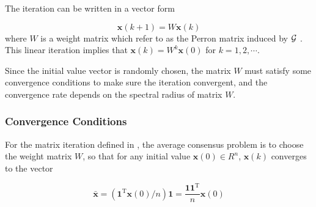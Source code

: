 The iteration  can be written in a vector
form 

\begin{equation}
\mathbf{x}(k+1)=W\mathbf{x}(k)\label{eq:first order matrix}
\end{equation}
where $W$ is a weight matrix which refer to as the Perron matrix
induced by ${\cal G}$ \cite{Olfati-Saber2004}. This linear iteration
implies that $\mathbf{x}(k)=W^{k}\mathbf{x}(0)$ for $k=1,2,\cdots$. 

Since the initial value vector is randomly chosen, the matrix $W$
must satisfy some convergence conditions to make sure the iteration
convergent, and the convergence rate depends on the spectral radius
of matrix $W$.


\subsubsection{Convergence Conditions}

For the matrix iteration defined in ,
the average consensus problem is to choose the weight matrix $W$,
so that for any initial value $\mathbf{x}(0)\in R^{n}$, $\mathbf{x}(k)$
converges to the vector 

\begin{equation}
\mathbf{\bar{x}}=\left(\mathbf{1}^{\mathrm{T}}\mathbf{x}(0)/n\right)\mathbf{1}=\dfrac{\mathbf{11}^{\mathrm{T}}}{n}\mathbf{x}(0)
\end{equation}

